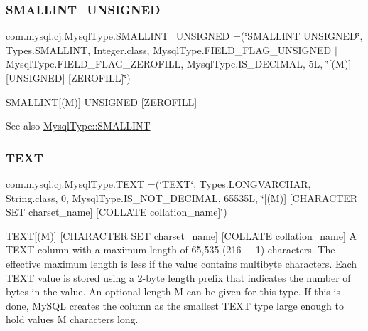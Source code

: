 \subsubsection{\texorpdfstring{S\+M\+A\+L\+L\+I\+N\+T\+\_\+\+U\+N\+S\+I\+G\+N\+ED}{SMALLINT\_UNSIGNED}}
{\footnotesize\ttfamily com.\+mysql.\+cj.\+Mysql\+Type.\+S\+M\+A\+L\+L\+I\+N\+T\+\_\+\+U\+N\+S\+I\+G\+N\+ED =(\char`\"{}S\+M\+A\+L\+L\+I\+NT U\+N\+S\+I\+G\+N\+ED\char`\"{}, Types.\+S\+M\+A\+L\+L\+I\+NT, Integer.\+class, Mysql\+Type.\+F\+I\+E\+L\+D\+\_\+\+F\+L\+A\+G\+\_\+\+U\+N\+S\+I\+G\+N\+ED $\vert$ Mysql\+Type.\+F\+I\+E\+L\+D\+\_\+\+F\+L\+A\+G\+\_\+\+Z\+E\+R\+O\+F\+I\+LL, Mysql\+Type.\+I\+S\+\_\+\+D\+E\+C\+I\+M\+AL, 5\+L, \char`\"{}\mbox{[}(\+M)\mbox{]} \mbox{[}\+U\+N\+S\+I\+G\+N\+E\+D\mbox{]} \mbox{[}\+Z\+E\+R\+O\+F\+I\+L\+L\mbox{]}\char`\"{})}

S\+M\+A\+L\+L\+I\+NT\mbox{[}(M)\mbox{]} U\+N\+S\+I\+G\+N\+ED \mbox{[}Z\+E\+R\+O\+F\+I\+LL\mbox{]}

\begin{DoxySeeAlso}{See also}
\mbox{\hyperlink{enumcom_1_1mysql_1_1cj_1_1_mysql_type_a6f47bd8cc33374c77f4af4d1b9758081}{Mysql\+Type\+::\+S\+M\+A\+L\+L\+I\+NT}} 
\end{DoxySeeAlso}
\mbox{\label{enumcom_1_1mysql_1_1cj_1_1_mysql_type_af97147cd8d895153093d3ba21bf44007}} 
\subsubsection{\texorpdfstring{T\+E\+XT}{TEXT}}
{\footnotesize\ttfamily com.\+mysql.\+cj.\+Mysql\+Type.\+T\+E\+XT =(\char`\"{}T\+E\+XT\char`\"{}, Types.\+L\+O\+N\+G\+V\+A\+R\+C\+H\+AR, String.\+class, 0, Mysql\+Type.\+I\+S\+\_\+\+N\+O\+T\+\_\+\+D\+E\+C\+I\+M\+AL, 65535\+L, \char`\"{}\mbox{[}(\+M)\mbox{]} \mbox{[}\+C\+H\+A\+R\+A\+C\+T\+E\+R S\+E\+T charset\+\_\+name\mbox{]} \mbox{[}\+C\+O\+L\+L\+A\+T\+E collation\+\_\+name\mbox{]}\char`\"{})}

T\+E\+XT\mbox{[}(M)\mbox{]} \mbox{[}C\+H\+A\+R\+A\+C\+T\+ER S\+ET charset\+\_\+name\mbox{]} \mbox{[}C\+O\+L\+L\+A\+TE collation\+\_\+name\mbox{]} A T\+E\+XT column with a maximum length of 65,535 (216 − 1) characters. The effective maximum length is less if the value contains multibyte characters. Each T\+E\+XT value is stored using a 2-\/byte length prefix that indicates the number of bytes in the value. An optional length M can be given for this type. If this is done, My\+S\+QL creates the column as the smallest T\+E\+XT type large enough to hold values M characters long.

